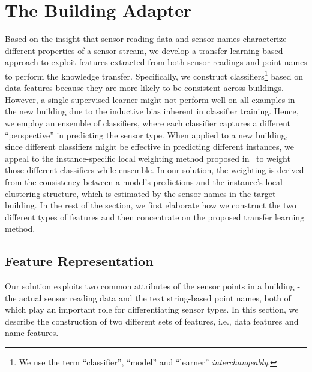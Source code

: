 \section{The Building Adapter}
Based on the insight that sensor reading data and sensor names characterize different properties of a sensor stream, we develop a transfer learning based approach to exploit features extracted from both sensor readings and point names to perform the knowledge transfer. Specifically, we construct classifiers\footnote{We use the term ``classifier'', ``model'' and ``learner'' {\it interchangeably}.} based on data features because they are more likely to be consistent across buildings.
However, a single supervised learner might not perform well on all examples in the new building due to the inductive bias inherent in classifier training. Hence, we employ an ensemble of classifiers, where each classifier captures a different ``perspective'' in predicting the sensor type.
When applied to a new building, since different classifiers might be effective in predicting different instances, we appeal to the instance-specific local weighting method proposed in~\cite{lwe} to weight those different classifiers while ensemble.
In our solution, the weighting is derived from the consistency between a model's predictions and the instance's local clustering structure, which is estimated by the sensor names in the target building.
In the rest of the section, we first elaborate how we construct the two different types of features and then concentrate on the proposed transfer learning method.


\subsection{Feature Representation}\label{feature}
Our solution exploits two common attributes of the sensor points in a building - the actual sensor reading data and the text string-based point names, both of which play an important role for differentiating sensor types.
In this section, we describe the construction of two different sets of features, i.e., data features and name features.

